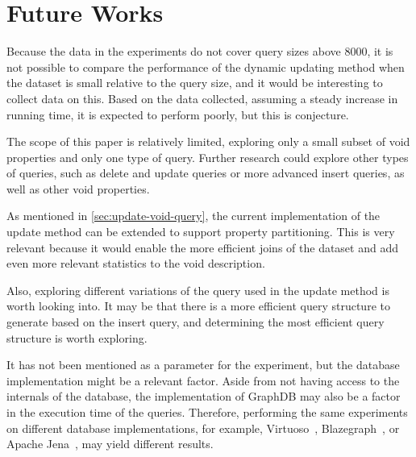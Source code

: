 \section{Future Works}\label{sec:future-works}
Because the data in the experiments do not cover query sizes above 8000, it is not possible to compare the performance of the dynamic updating method when the dataset is small relative to the query size, and it would be interesting to collect data on this. Based on the data collected, assuming a steady increase in running time, it is expected to perform poorly, but this is conjecture.

The scope of this paper is relatively limited, exploring only a small subset of \gls{void} properties and only one type of query. Further research could explore other types of queries, such as delete and update queries or more advanced insert queries, as well as other \gls{void} properties.

As mentioned in \autoref{sec:update-void-query}, the current implementation of the update method can be extended to support property partitioning. This is very relevant because it would enable the more efficient joins of the dataset and add even more relevant statistics to the \gls{void} description.

Also, exploring different variations of the query used in the update method is worth looking into. It may be that there is a more efficient query structure to generate based on the insert query, and determining the most efficient query structure is worth exploring.

It has not been mentioned as a parameter for the experiment, but the database implementation might be a relevant factor. Aside from not having access to the internals of the database, the implementation of GraphDB may also be a factor in the execution time of the queries. Therefore, performing the same experiments on different database implementations, for example, Virtuoso~\cite{virtuoso}, Blazegraph~\cite{blazegraph}, or Apache Jena~\cite{apache-jena}, may yield different results.